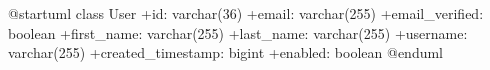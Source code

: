 \begin{plantuml}

@startuml
class User {
    +id: varchar(36)
    +email: varchar(255)
    +email_verified: boolean
    +first_name: varchar(255)
    +last_name: varchar(255)
    +username: varchar(255)
    +created_timestamp: bigint
    +enabled: boolean
}
@enduml

\end{plantuml}

